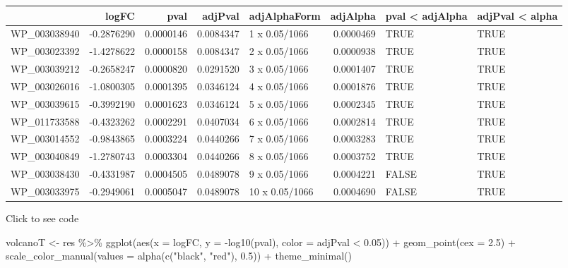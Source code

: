 \documentclass[
]{article}
\newenvironment{Shaded}{\begin{snugshade}}{\end{snugshade}}
\newcommand{\AttributeTok}[1]{\textcolor[rgb]{0.77,0.63,0.00}{#1}}
\newcommand{\FloatTok}[1]{\textcolor[rgb]{0.00,0.00,0.81}{#1}}
\newcommand{\FunctionTok}[1]{\textcolor[rgb]{0.00,0.00,0.00}{#1}}
\newcommand{\NormalTok}[1]{#1}
\newcommand{\OtherTok}[1]{\textcolor[rgb]{0.56,0.35,0.01}{#1}}
\newcommand{\SpecialCharTok}[1]{\textcolor[rgb]{0.00,0.00,0.00}{#1}}
\newcommand{\StringTok}[1]{\textcolor[rgb]{0.31,0.60,0.02}{#1}}
\begin{document}
\begin{longtable}[]{@{}lrrrlrll@{}}
\toprule
& logFC & pval & adjPval & adjAlphaForm & adjAlpha & pval \textless{}
adjAlpha & adjPval \textless{} alpha \\
\midrule
\endhead
WP\_003038940 & -0.2876290 & 0.0000146 & 0.0084347 & 1 x 0.05/1066 &
0.0000469 & TRUE & TRUE \\
WP\_003023392 & -1.4278622 & 0.0000158 & 0.0084347 & 2 x 0.05/1066 &
0.0000938 & TRUE & TRUE \\
WP\_003039212 & -0.2658247 & 0.0000820 & 0.0291520 & 3 x 0.05/1066 &
0.0001407 & TRUE & TRUE \\
WP\_003026016 & -1.0800305 & 0.0001395 & 0.0346124 & 4 x 0.05/1066 &
0.0001876 & TRUE & TRUE \\
WP\_003039615 & -0.3992190 & 0.0001623 & 0.0346124 & 5 x 0.05/1066 &
0.0002345 & TRUE & TRUE \\
WP\_011733588 & -0.4323262 & 0.0002291 & 0.0407034 & 6 x 0.05/1066 &
0.0002814 & TRUE & TRUE \\
WP\_003014552 & -0.9843865 & 0.0003224 & 0.0440266 & 7 x 0.05/1066 &
0.0003283 & TRUE & TRUE \\
WP\_003040849 & -1.2780743 & 0.0003304 & 0.0440266 & 8 x 0.05/1066 &
0.0003752 & TRUE & TRUE \\
WP\_003038430 & -0.4331987 & 0.0004505 & 0.0489078 & 9 x 0.05/1066 &
0.0004221 & FALSE & TRUE \\
WP\_003033975 & -0.2949061 & 0.0005047 & 0.0489078 & 10 x 0.05/1066 &
0.0004690 & FALSE & TRUE \\
\bottomrule
\end{longtable}

Click to see code

\begin{Shaded}
\begin{Highlighting}[]
\NormalTok{volcanoT }\OtherTok{\textless{}{-}}\NormalTok{ res }\SpecialCharTok{\%\textgreater{}\%} 
  \FunctionTok{ggplot}\NormalTok{(}\FunctionTok{aes}\NormalTok{(}\AttributeTok{x =}\NormalTok{ logFC, }\AttributeTok{y =} \SpecialCharTok{{-}}\FunctionTok{log10}\NormalTok{(pval), }\AttributeTok{color =}\NormalTok{ adjPval }\SpecialCharTok{\textless{}} \FloatTok{0.05}\NormalTok{)) }\SpecialCharTok{+}
    \FunctionTok{geom\_point}\NormalTok{(}\AttributeTok{cex =} \FloatTok{2.5}\NormalTok{) }\SpecialCharTok{+}
    \FunctionTok{scale\_color\_manual}\NormalTok{(}\AttributeTok{values =} \FunctionTok{alpha}\NormalTok{(}\FunctionTok{c}\NormalTok{(}\StringTok{"black"}\NormalTok{, }\StringTok{"red"}\NormalTok{), }\FloatTok{0.5}\NormalTok{)) }\SpecialCharTok{+}
    \FunctionTok{theme\_minimal}\NormalTok{() }
\end{Highlighting}
\end{Shaded}
\end{document}
